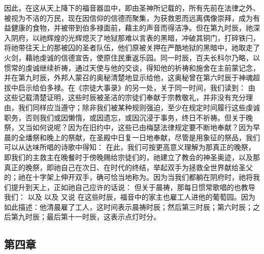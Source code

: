 因此，在这从天上降下的福音器皿中，即由圣神所记载的，所有先前在法律之外、被视为不洁的万民，现在因信仰的信德而聚集，为获救恩而远离偶像崇拜，成为有益健康的食物，并被带到伯多禄面前，藉主的声音而得洁净。但在第九时辰，祂深入阴府，以祂辉煌的光辉熄灭了地狱那难以言表的黑暗，冲破其铜门，打碎铁闩，将祂带往天上的那被囚的圣者队伍，他们原被关押在严酷地狱的黑暗中，祂取走了火剑，藉祂虔诚的信德宣告，使原住民重返乐园。同一时辰，百夫长科尔乃略，以惯常的虔诚继续祈祷，通过天使与他的交谈，得知他的祈祷和施舍在主前蒙记念，并在第九时辰，外邦人蒙召的奥秘清楚地显示给他，这奥秘曾在第六时辰于神魂超拔中启示给伯多禄。在《宗徒大事录》的另一处，关于同一时间，我们读到：  由这些记载清楚证明，这些时辰被圣洁的宗徒们奉献于宗教敬礼，并非没有充分理由，我们同样应当遵守；除非我们被某种规则强迫，至少在规定时间履行这些虔诚职务，否则我们或因懒惰，或因遗忘，或因沉浸于事务，终日不祈祷。但关于晚祭，又当如何说呢？因为在旧约中，这些已由梅瑟法律规定要不断地奉献？因为早晨的全燔祭和晚上的祭献，在圣殿中日复一日地奉献，尽管是用象征的祭品，我们可以从达味所唱的诗歌中得知： 在此，我们可按更高意义理解为那真正的晚祭，即我们的主救主在晚餐时于傍晚赐给宗徒们的，祂建立了教会的神圣奥迹，以及那真正的晚祭，即祂自己在次日、在时代的终结，举起双手为拯救全世界献给圣父的；祂在十字架上伸开双手，确可恰当地称为。因为当我们都躺在阴府时，祂将我们提升到天上，正如祂自己应许的话说：  但关于晨祷，那每日惯常歌唱的也教导我们： 以及 以及 又说 在这些时辰，福音中的家主也雇工人进他的葡萄园。因为如此描述：他清晨雇了工人，这时间表示晨祷时辰；然后第三时辰；第六时辰；之后第九时辰；最后第十一时辰，这表示点灯时分。\par


\subsection{第四章}

\par

